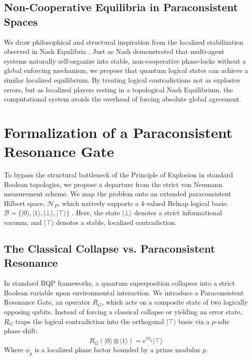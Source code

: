 \documentclass[conference]{IEEEtran}
\newcommand{\ket}[1]{|#1\rangle}
\begin{document}
\subsection{Non-Cooperative Equilibria in Paraconsistent Spaces}
We draw philosophical and structural inspiration from the localized stabilization observed in Nash Equilibria \cite{nash1950equilibrium}. Just as Nash demonstrated that multi-agent systems naturally self-organize into stable, non-cooperative phase-locks without a global enforcing mechanism, we propose that quantum logical states can achieve a similar localized equilibrium. By treating logical contradictions not as explosive errors, but as localized players resting in a topological Nash Equilibrium, the computational system avoids the overhead of forcing absolute global agreement.

\section{Formalization of a Paraconsistent Resonance Gate}
To bypass the structural bottleneck of the Principle of Explosion in standard Boolean topologies, we propose a departure from the strict von Neumann measurement scheme. We map the problem onto an extended paraconsistent Hilbert space, $\mathcal{H}_P$, which natively supports a 4-valued Belnap logical basis: $\mathcal{B} = \{\ket{0}, \ket{1}, \ket{\bot}, \ket{\top}\}$ \cite{belnap1977useful}. Here, the state $\ket{\bot}$ denotes a strict informational vacuum, and $\ket{\top}$ denotes a stable, localized contradiction.

\subsection{The Classical Collapse vs. Paraconsistent Resonance}
In standard BQP frameworks, a quantum superposition collapses into a strict Boolean variable upon environmental interaction. We introduce a Paraconsistent Resonance Gate, an operator $R_G$, which acts on a composite state of two logically opposing qubits. Instead of forcing a classical collapse or yielding an error state, $R_G$ traps the logical contradiction into the orthogonal $\ket{\top}$ basis via a $p$-adic phase shift:
\begin{equation}
R_G \left( \ket{0} \otimes \ket{1} \right) = e^{i\phi_p} \ket{\top}
\end{equation}
Where $\phi_p$ is a localized phase factor bounded by a prime modulus $p$.
\end{document}
